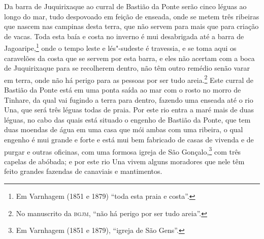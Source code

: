 \begin{linenumbers}
Da barra de Juquirixaque ao curral de Bastião da Ponte serão cinco léguas ao longo do mar,
tudo despovoado em feição de enseada, onde se metem três ribeiras que nascem nas campinas
desta terra, que não servem para mais que para criação de vacas. Toda esta baía e costa no
inverno é mui desabrigada até a barra de Jagoaripe,\footnote{ Em Varnhagem (1851 e 1879)
``toda esta praia e costa''.} onde o tempo leste e lés"-sudeste é travessia, e se toma
aqui os caravelões da costa que se servem por esta barra, e eles não acertam com a boca de
Juquirixaque para se recolherem dentro, não têm outro remédio senão varar em terra, onde
não há perigo para as pessoas por ser tudo areia.\footnote{ No manuscrito da
\textsc{bgjm}, ``não há perigo por ser tudo areia''.} Este curral de Bastião da Ponte
está em uma ponta saída ao mar com o rosto no morro de Tinhare, da qual vai fugindo a
terra para dentro, fazendo uma enseada até o rio Una, que será três léguas todas de praia.
Por este rio entra a maré mais de duas léguas, no cabo das quais está situado o engenho de
Bastião da Ponte, que tem duas moendas de água em uma casa que mói ambas com uma ribeira,
o qual engenho é mui grande e forte e está mui bem fabricado de casas de vivenda e de
purgar e outras oficinas, com uma formosa igreja de São Gonçalo,\footnote{ Em Varnhagem
(1851 e 1879), ``igreja de São Gens''.} com três capelas de abóbada; e por este rio Una
vivem alguns moradores que nele têm feito grandes fazendas de canaviais e mantimentos.


\end{linenumbers}
